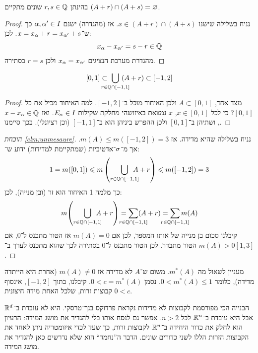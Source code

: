 \documentclass[name=רשימות פונקציות ממשיות – WIP]{../../../tex/classes/noChapterMegasumPreamble}
\begin{document}
	\begin{Lemma}[ראשונה]
		בהינתן $r, s \in \mathbb{Q}$ שונים מתקיים $(A + r) \cap (A + s) = \varnothing$. 
	\end{Lemma}\begin{proof}
		נניח בשלילה שישנו $x \in (A + r) \cap (A + s)$. אז (מהגדרה) ישנם $\alpha, \alpha' \in I$ כך ש־$x = x_\alpha + r = x_{\alpha'} + s$. לכן: 
		\[ x_\alpha  - x_{\alpha'} = s - r \in \mathbb{Q} \]
		מהגדרת מערכת הנציגים $x_{\alpha} = x_{\alpha'}$ ולכן $r = s$ בסתירה. 
	\end{proof}\begin{Lemma}[שנייה]
		\[ [0, 1] \subset \ \bigcup_{\mathclap{r \in \Q \cap [-1, 1]}} \ (A + r) \subset [-1, 2] \]
	\end{Lemma}\begin{proof}
		מצד אחד, $A \subset[0, 1]$ ולכן האיחוד מוכל ב־$[-1, 2]$. למה האיחוד מכיל את כל $[0, 1]$? כי לכל $x \in [0, 1]$, $x$ נמצאת באיזושהי מחלקת שקילות $E_\alpha \in I$. ואז $x - x_\alpha \in \mathbb{Q}$, ושתיהן ב־$[0, 1]$ ולכן ההפרש ביניהן הוא ב־$[-1, 1]$ (וכן רציונלי). בכך סיימנו. 
	\end{proof}
	\begin{proof}[הוכחת \ref{clm:unmesaure}]
		נניח בשלילה שהיא מדידה. אז $m(A) \le m([-1, 2]) = 3$. אך מ־$\sigma$־אדטיביות (שמתקיימת למדידות) ידוע ש־: 
		\[ 1 = m([0, 1]) \leqslant m\left ( \bigcup_{r \in \mathbb{Q}\cap[-1, 1]}\!\!\!\!\!\! A + r \right ) \leqslant m([-1, 2]) = 3 \]
		כך מלמה 1 האיחוד הוא זר (ובן מנייה), לכן: 
		\[ m{\cl{\bigcup_{r \in \Q\cap[-1, 1]}\dequad A + r} } = \sum_{\mathclap{r \in \Q\cap[-1, 1]}}(A + r) = \sum_{\mathclap{r \in \Q\cap[-1, 1]}}m(A) \]
		קיבלנו סכום בן מנייה של אותו המספר, לכן אם $m(A) = 0$ אז הטור מתכנס ל־$0$, אם $m(A) > 0$ הטור מתבדר. לכן הטור מתכנס ל־$0$ בסתירה לכך שהוא מתכנס לערך ב־$[1, 3]$. 
	\end{proof}
	
	מעניין לשאול מה $m^*(A)$. משום ש־$A$ לא מדידה אז $m(A) \neq 0$ (אחרת היא הייתדה מדידה), כלומר $0 < m^*(A) \le 1$. נסמן $0 < c = m^*(A)$. קיבלנו, בתוך $[-1, 2]$, אינסוף קבוצות זרות, שלכל האחת מידה חיצונית $0 < c$. 
	
	הבנייה הכי מפורסמת לקבוצות לא מדידות נקראת פרדוקס בנך־טרסקי. היא לא עובדת ב־$\mathbb{R}^{d}$ אבל היא עובדת ב־$\mathbb{R}^{n}$ לכל $n > 2$. אפשר גם לנסח אותו בלי להגדיר את מושג המידה: הרעיון הוא לחלק את כדור היחידה ב־$\mathbb{R}^{n}$ לקבוצות זרות, כך שעד לכדי איזומטריה ניתן לאחד את הקבוצות הזרות הללו לשני כדורים שונים. הדבר ה''נחמד`` הוא שלא נדרשים כאן להגדיר את מושג המידה. 
	
\end{document}
